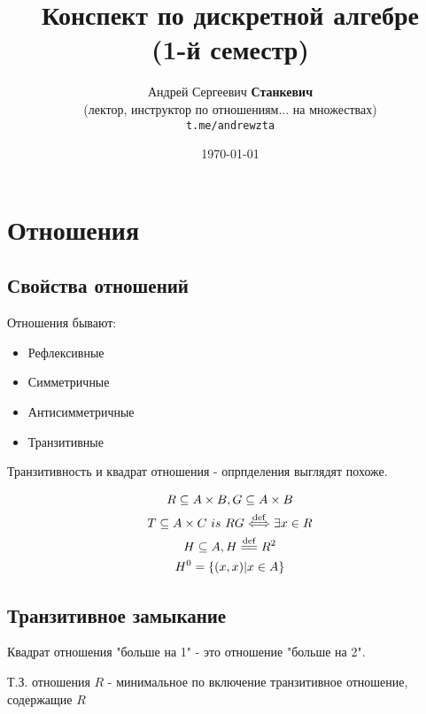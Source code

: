 \documentclass[a4paper, 12pt]{article}
\title{Конспект по дискретной алгебре \\(1-й семестр)}
\author{
  \vova
  \and
  Андрей Сергеевич \textbf{Станкевич} \\
  (лектор, инструктор по отношениям... на множествах) \\
  \texttt{t.me/andrewzta}
}
\date{\today}
\begin{document}
    \maketitle
    \newpage
    \tableofcontents
    \newpage


    \section{Отношения}

    \subsection{Свойства отношений}

    Отношения бывают:
    \begin{itemize}
        \item Рефлексивные
        \item Симметричные
        \item Антисимметричные
        \item Транзитивные
    \end{itemize}

    Транзитивность и квадрат отношения - опрпделения выглядят похоже.

    \begin{definition}
        \begin{gather}
            R \subseteq A \times B, G \subseteq A \times B\\
            T \subseteq A \times C ~ is ~ RG \isdef \exists x \in R \\
            H \subseteq A, H \eqdef R^2 \\
            H^0 = \{ (x, x) | x \in A \}
        \end{gather}
    \end{definition}
 
    
    \subsection{Транзитивное замыкание}

    \begin{note}
        Квадрат отношения "больше на 1" - это отношение "больше на 2".
    \end{note}

    \begin{definition}\nl
        Т.З. отношения $R$ - минимальное 
        по включение транзитивное отношение, содержащие $R$
    \end{definition}
\end{document}
